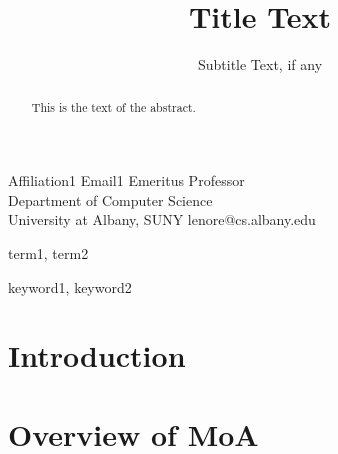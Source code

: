 \documentclass{sigplanconf}
\begin{document}
\setlength{\pdfpageheight}{\paperheight}
\setlength{\pdfpagewidth}{\paperwidth}






\title{Title Text}
\subtitle{Subtitle Text, if any}

           {Affiliation1}
           {Email1}
           {Emeritus Professor\\Department of Computer Science \\
University at Albany, SUNY}
           {lenore@cs.albany.edu}

\maketitle

\begin{abstract}
This is the text of the abstract.
\end{abstract}


\terms
term1, term2

\keywords
keyword1, keyword2

\section{Introduction}

\section{Overview of MoA}

\end{document}
